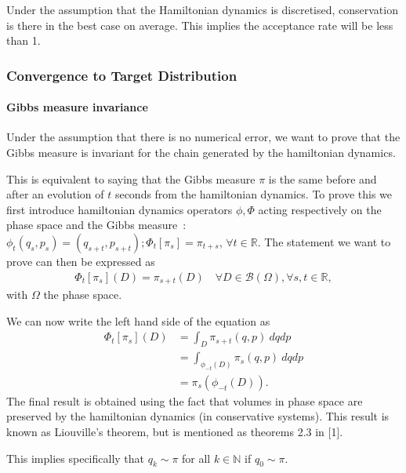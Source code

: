 \documentclass[a4paper, 12pt,oneside]{article}
\begin{document}
			Under the assumption that the Hamiltonian dynamics is discretised, conservation is there in the best case on average. This implies the acceptance rate will be less than 1. 
			\subsubsection{Convergence to Target Distribution}
			\paragraph{Gibbs measure invariance}
			Under the assumption that there is no numerical error, we want to prove that the Gibbs measure is invariant for the chain generated by the hamiltonian dynamics.
	
			This is equivalent to saying that the Gibbs measure $\pi$ is the same before and after an evolution of $t$ seconds from the hamiltonian dynamics. 
			To prove this we first introduce hamiltonian dynamics operators $\phi,\Phi$ acting respectively on the phase space and the Gibbs measure~: $\phi_t(q_s,p_s)=(q_{s+t},p_{s+t});\Phi_t[\pi_s]=\pi_{t+s}$, $\forall t\in\mathbb{R}$.
			The statement we want to prove can then be expressed as 
			\begin{gather}
				\Phi_t[\pi_s](D)=\pi_{s+t}(D)\quad \forall D\in\mathcal{B}(\Omega),\forall s,t\in\mathbb{R},
			\end{gather}
			with $\Omega$ the phase space.
	
			We can now write the left hand side of the equation as
			\begin{align}
				\Phi_t[\pi_s](D)&=\int_D \pi_{s+t}(q,p)\ dqdp \\
					&=\int_{\phi_{-t}(D)}\pi_{s}(q,p)\ dqdp \\
					&=\pi_s(\phi_{-t}(D)).
			\end{align}
			The final result is obtained using the fact that volumes in phase space are preserved by the hamiltonian dynamics (in conservative systems). This result is known as Liouville's theorem, but is mentioned as theorems 2.3 in [1].
	
			This implies specifically that $q_k\sim\pi$ for all $k\in\mathbb{N}$ if $q_0\sim \pi$. 
	
\end{document}
